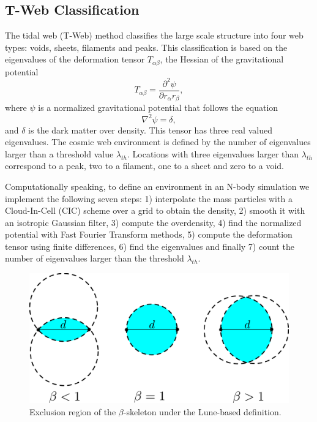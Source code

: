 \documentclass[usenatbib]{mnras}
\begin{document}
\subsection{T-Web Classification}

The tidal web (T-Web) method \citep{Hahn2007,Forero-Romero2009}
classifies the large scale structure into four web types: voids,
sheets, filaments and peaks.   
This classification is based on the eigenvalues of the deformation
tensor $T_{\alpha\beta}$, the Hessian of the gravitational potential 
\begin{equation}
T_{\alpha\beta}=\frac{\partial^2\psi}{\partial r_{\alpha}r_{\beta}},
\end{equation}
%
where $\psi$ is a normalized gravitational potential that follows the equation
\begin{equation}
    \nabla^2 \psi = \delta,
\end{equation}
%
and $\delta$ is the dark matter over density.
This tensor has three real valued eigenvalues. 
The cosmic web environment is defined by the number of eigenvalues
larger than a threshold value $\lambda_{th}$.
Locations with three eigenvalues larger than $\lambda_{th}$ correspond
to a peak, two to a filament, one to a sheet and zero to a void. 

Computationally speaking, to define an environment in an N-body
simulation we implement the following seven steps: 1) interpolate the
mass particles with a Cloud-In-Cell  (CIC) scheme over a grid to
obtain the density, 2) smooth it with an isotropic Gaussian filter,
3) compute the overdensity, 4) find the normalized potential with Fast
Fourier Transform  methods, 5) compute the deformation tensor using
finite differences, 6) find the eigenvalues and finally 7) count the
number of eigenvalues larger than the threshold $\lambda_{th}$. 

\begin{figure}
\centering
 \includegraphics[scale=0.18]{Figs/p_beta.pdf}
 \caption{Exclusion region of the $\beta$-skeleton under the Lune-based definition. }  
 \label{fig:beta}
\end{figure}
\end{document}
